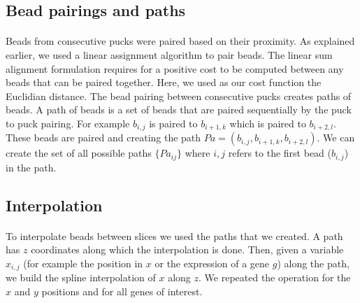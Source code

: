 \documentclass[10pt,a4paper]{article}
\begin{document}
\subsection{Bead pairings and paths}
\paragraph{}Beads from consecutive pucks were paired based on their proximity.
As explained earlier, we used a linear assignment algorithm to pair beads.
The linear sum alignment formulation requires for a positive cost to be computed between any beads that can be paired together.
Here, we used as our cost function the Euclidian distance.
The bead pairing between consecutive pucks creates paths of beads. A path of beads is a set of beads that are paired sequentially by the puck to puck pairing. For example \(b_{i,j}\) is paired to \(b_{i+1,k}\) which is paired to \(b_{i+2,l}\). These beads are paired and creating the path \(Pa=(b_{i,j}, b_{i+1,k},b_{i+2,l})\). We can create the set of all possible paths \(\{Pa_{ij}\}\) where \(i,j\) refers to the first bead (\(b_{i,j}\)) in the path.
\subsection{Interpolation}
\paragraph{}To interpolate beads between slices we used the paths that we created. A path has \(z\) coordinates along which the interpolation is done. Then, given a variable \(x_{i,j}\) (for example the position in \(x\) or the expression of a gene \(g\)) along the path, we build the spline interpolation of \(x\) along \(z\). We repeated the operation for the \(x\) and \(y\) positions and for all genes of interest.
\end{document}
